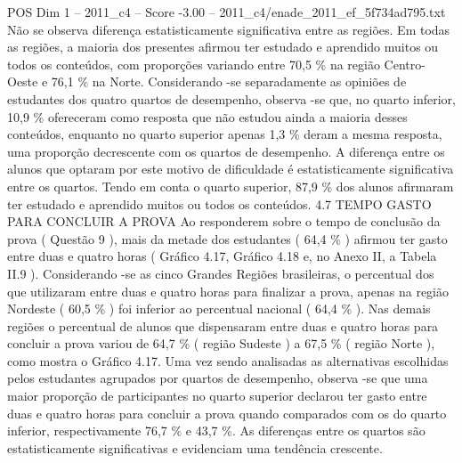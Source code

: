\begin{textsample}{POS Dim 1 – 2011\_c4 – Score -3.00 – 2011\_c4/enade\_2011\_ef\_5f734ad795.txt}
Não se observa diferença estatisticamente significativa entre as regiões.
Em todas as regiões, a maioria dos presentes afirmou ter estudado e aprendido muitos ou todos os conteúdos, com proporções variando entre 70,5 \% na região Centro-Oeste e 76,1 \% na Norte.
Considerando -se separadamente as opiniões de estudantes dos quatro quartos de desempenho, observa -se que, no quarto inferior, 10,9 \% ofereceram como resposta que não estudou ainda a maioria desses conteúdos, enquanto no quarto superior apenas 1,3 \% deram a mesma resposta, uma proporção decrescente com os quartos de desempenho.
A diferença entre os alunos que optaram por este motivo de dificuldade é estatisticamente significativa entre os quartos.
Tendo em conta o quarto superior, 87,9 \% dos alunos afirmaram ter estudado e aprendido muitos ou todos os conteúdos. 4.7 TEMPO GASTO PARA CONCLUIR A PROVA Ao responderem sobre o tempo de conclusão da prova ( Questão 9 ), mais da metade dos estudantes ( 64,4 \% ) afirmou ter gasto entre duas e quatro horas ( Gráfico 4.17, Gráfico 4.18 e, no Anexo II, a Tabela II.9 ).
Considerando -se as cinco Grandes Regiões brasileiras, o percentual dos que utilizaram entre duas e quatro horas para finalizar a prova, apenas na região Nordeste ( 60,5 \% ) foi inferior ao percentual nacional ( 64,4 \% ).
Nas demais regiões o percentual de alunos que dispensaram entre duas e quatro horas para concluir a prova variou de 64,7 \% ( região Sudeste ) a 67,5 \% ( região Norte ), como mostra o Gráfico 4.17.
Uma vez sendo analisadas as alternativas escolhidas pelos estudantes agrupados por quartos de desempenho, observa -se que uma maior proporção de participantes no quarto superior declarou ter gasto entre duas e quatro horas para concluir a prova quando comparados com os do quarto inferior, respectivamente 76,7 \% e 43,7 \%.
As diferenças entre os quartos são estatisticamente significativas e evidenciam uma tendência crescente.

\end{textsample}
